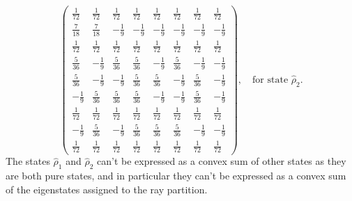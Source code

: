 \documentclass[a4paper]{article}
\begin{document}
  \begin{equation}
    \displaystyle \left(\begin{array}{rrrrrrrr}
    \frac{1}{72} & \frac{1}{72} & \frac{1}{72} &
    \frac{1}{72} & \frac{1}{72} & \frac{1}{72} &
    \frac{1}{72} & \frac{1}{72} \\ [6pt]
    \frac{7}{18} & \frac{7}{18} & -\frac{1}{9} &
    -\frac{1}{9} & -\frac{1}{9} & -\frac{1}{9} &
    -\frac{1}{9} & -\frac{1}{9} \\ [6pt]
    \frac{1}{72} & \frac{1}{72} & \frac{1}{72} &
    \frac{1}{72} & \frac{1}{72} & \frac{1}{72} &
    \frac{1}{72} & \frac{1}{72} \\ [6pt]
    \frac{5}{36} & -\frac{1}{9} & \frac{5}{36} &
    \frac{5}{36} & -\frac{1}{9} & \frac{5}{36} &
    -\frac{1}{9} & -\frac{1}{9} \\ [6pt]
    \frac{5}{36} & -\frac{1}{9} & -\frac{1}{9} &
    \frac{5}{36} & \frac{5}{36} & -\frac{1}{9} &
    \frac{5}{36} & -\frac{1}{9} \\ [6pt]
    -\frac{1}{9} & \frac{5}{36} & \frac{5}{36} &
    \frac{5}{36} & -\frac{1}{9} & -\frac{1}{9} &
    \frac{5}{36} & -\frac{1}{9} \\ [6pt]
    \frac{1}{72} & \frac{1}{72} & \frac{1}{72} &
    \frac{1}{72} & \frac{1}{72} & \frac{1}{72} &
    \frac{1}{72} & \frac{1}{72} \\ [6pt]
    -\frac{1}{9} & \frac{5}{36} & -\frac{1}{9} &
    \frac{5}{36} & \frac{5}{36} & \frac{5}{36} &
    -\frac{1}{9} & -\frac{1}{9} \\ [6pt]
    \frac{1}{72} & \frac{1}{72} & \frac{1}{72} &
    \frac{1}{72} & \frac{1}{72} & \frac{1}{72} &
    \frac{1}{72} & \frac{1}{72}
    \end{array}\right),
    \quad
    \text{for state } \hat\rho_2.
  \end{equation}
  The states $\hat\rho_1$ and $\hat\rho_2$ can't be
  expressed as a convex sum of other states as they are both
  pure states, and in particular they can't be expressed as
  a convex sum of the eigenstates assigned to the ray
  partition.
  
\end{document}
